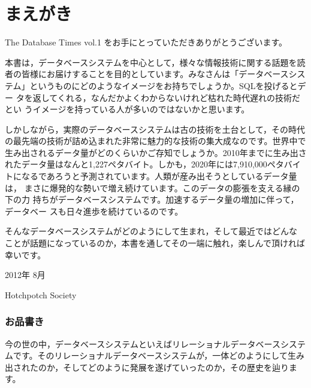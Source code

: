 
\chapter*{まえがき}
\thispagestyle{plainhead}

The Database Times vol.1 をお手にとっていただきありがとうございます。

本書は，データベースシステムを中心として，様々な情報技術に関する話題を読
者の皆様にお届けすることを目的としています。みなさんは「データベースシス
テム」というものにどのようなイメージをお持ちでしょうか。SQLを投げるとデー
タを返してくれる，なんだかよくわからないけれど枯れた時代遅れの技術だとい
うイメージを持っている人が多いのではないかと思います。

しかしながら，実際のデータベースシステムは古の技術を土台として，その時代
の最先端の技術が詰め込まれた非常に魅力的な技術の集大成なのです。世界中で
生み出されるデータ量がどのくらいかご存知でしょうか。2010年までに生み出さ
れたデータ量はなんと1,227ペタバイト。しかも，2020年には7,910,000ペタバイ
トになるであろうと予測されています。人類が産み出そうとしているデータ量は，
まさに爆発的な勢いで増え続けています。このデータの膨張を支える縁の下の力
持ちがデータベースシステムです。加速するデータ量の増加に伴って，データベー
スも日々進歩を続けているのです。

そんなデータベースシステムがどのようにして生まれ，そして最近ではどんな
ことが話題になっているのか，本書を通してその一端に触れ，楽しんで頂ければ
幸いです。

\begin{flushright}
 2012年 8月

Hotchpotch Society
\end{flushright}

\newpage

\subsection*{お品書き}


今の世の中，データベースシステムといえばリレーショナルデータベースシステ
ムです。そのリレーショナルデータベースシステムが，一体どのようにして生み
出されたのか，そしてどのように発展を遂げていったのか，その歴史を辿ります。

\vspace*{\Cvs}


